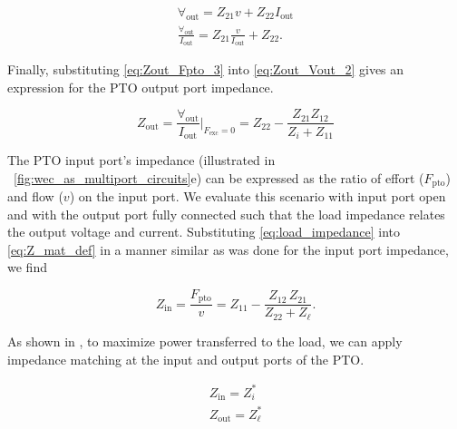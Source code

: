 \documentclass[lettersize,journal]{IEEEtran}
\begin{document}
\begin{subequations}
        \begin{align}
                \forall_{\textrm{out}} = Z_{21} v + Z_{22} I_{\textrm{out}} \label{eq:Zout_Vout_1} \\[0.5em]
                \frac{\forall_{\textrm{out}}}{I_{\textrm{out}}} = Z_{21} \frac{v}{I_{\textrm{out}}} + Z_{22} . \label{eq:Zout_Vout_2}
        \end{align} 
        \label{eq:Zout_Vout}
\end{subequations}

\noindent{}Finally, substituting \eqref{eq:Zout_Fpto_3} into \eqref{eq:Zout_Vout_2} gives an expression for the PTO output port impedance.

\begin{equation}
        Z_{\textrm{out}} = \frac{\forall_{\textrm{out}}}{I_{\textrm{out}}} \bigg\vert_{F_{\textrm{exc}}=0} = Z_{22} - \frac{Z_{21} Z_{12}}{Z_{i} + Z_{11}}
        \label{eq:pto_output_port_impedance}
\end{equation}

The PTO input port's impedance (illustrated in \figurename~\ref{fig:wec_as_multiport_circuits}e) can be expressed as the ratio of effort ($F_{\textrm{pto}}$) and flow ($v$) on the input port.
We evaluate this scenario with input port open and with the output port fully connected such that the load impedance relates the output voltage and current.
Substituting \eqref{eq:load_impedance} into \eqref{eq:Z_mat_def} in a manner similar as was done for the input port impedance, we find

\begin{equation}
        Z_{\textrm{in}} = \frac{F_{\textrm{pto}}}{v} =  Z_{11} - \frac{Z_{12} \, Z_{21}}{Z_{22} + Z_\ell} .
        \label{eq:pto_input_port_impedance}
\end{equation}

As shown in  \cite{Bacelli:2021aa}, to maximize power transferred to the load, we can apply impedance matching at the input and output ports of the PTO.

\begin{subequations}
    \begin{align}
        Z_{\textrm{in}} = Z_i^*  \label{eq:bi_conj_matching_in} \\ 
        Z_{\textrm{out}} = Z_\ell^* \label{eq:bi_conj_matching_out}
    \end{align}
\label{eq:bi_conj_matching}
\end{subequations}
\end{document}
